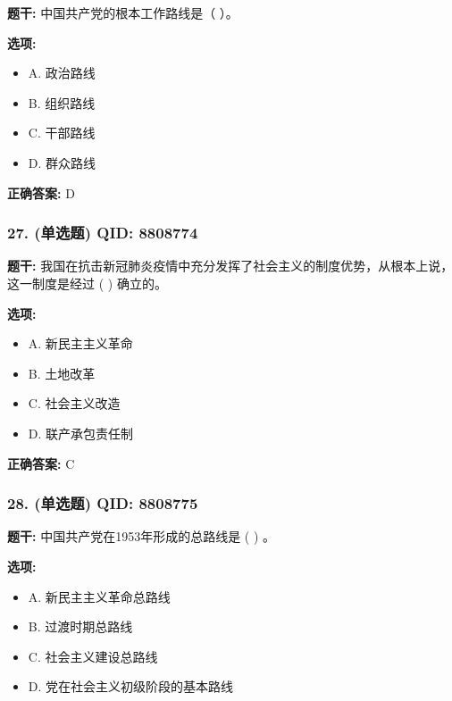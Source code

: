 \documentclass[12pt,UTF8]{ctexart}
\begin{document}
\textbf{题干:}
中国共产党的根本工作路线是（ ）。

\textbf{选项:}
\begin{itemize}[leftmargin=*]

  \item A. 政治路线

  \item B. 组织路线

  \item C. 干部路线

  \item D. 群众路线

\end{itemize}

\textbf{正确答案:}
D

\vspace{0.3em}\hrulefill\vspace{0.7em}

\subsubsection*{27. (单选题) \small QID: 8808774}

\textbf{题干:}
我国在抗击新冠肺炎疫情中充分发挥了社会主义的制度优势，从根本上说，这一制度是经过 ( ) 确立的。

\textbf{选项:}
\begin{itemize}[leftmargin=*]

  \item A. 新民主主义革命

  \item B. 土地改革

  \item C. 社会主义改造

  \item D. 联产承包责任制

\end{itemize}

\textbf{正确答案:}
C

\vspace{0.3em}\hrulefill\vspace{0.7em}

\subsubsection*{28. (单选题) \small QID: 8808775}

\textbf{题干:}
中国共产党在1953年形成的总路线是 ( ) 。

\textbf{选项:}
\begin{itemize}[leftmargin=*]

  \item A. 新民主主义革命总路线

  \item B. 过渡时期总路线

  \item C. 社会主义建设总路线

  \item D. 党在社会主义初级阶段的基本路线

\end{itemize}
\end{document}

